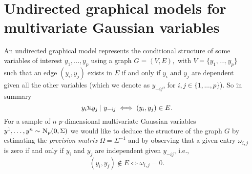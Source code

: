 \documentclass[a4paper, 11pt, oneside]{report}
\newcommand{\1}{\mathds{1}}
\newcommand{\inv}{^{-1}}
\newcommand{\Np}{\textsc{N}_p}
\newcommand{\nindep}{{\rotatebox[origin=c]{90}{$\nvDash$}}}
\begin{document}
\chapter{Undirected graphical models for multivariate Gaussian
  variables}\label{sect:graphs}
An undirected graphical model represents the conditional
structure of some variables of interest $y_1, \dots, y_p$ using a
graph $G=(V, E),$ with $V = \{y_1, \dots, y_p\}$ such that an edge $(y_i, y_j)$
exists in $E$ if and only if $y_i$ and $y_j$ are dependent given all the other
variables (which we denote as $y_{-ij}$, for $i,j \in \{1,\dots,p\}$). So in summary
\[y_i \nindep y_j \mid y_{-ij} \iff (y_i, y_j) \in E.\]
For a sample
of $n$ $p$-dimensional multivariate Gaussian variables $y^1, \dots, y^n \sim
	\Np(0, \Sigma)$ we would like to deduce the structure of the graph $G$ by
estimating the \emph{precision matrix} $\Omega =
	\Sigma\inv$ and by observing that a given entry $\omega_{i,j}$ is zero if and only if $y_i$ and $y_j$ are
independent given $y_{-ij}$, i.e.,
\[(y_i, y_j) \notin E \iff \omega_{i,j} = 0.\]
\end{document}
